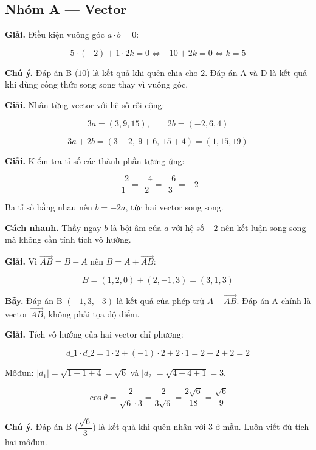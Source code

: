 \documentclass[11pt, a4paper]{article}
\begin{document}

\subsection*{Nhóm A — Vector}

\begin{dapan}[1 — Đáp án C]
\textbf{Giải.} Điều kiện vuông góc $a \cdot b = 0$:

$$5 \cdot (-2) + 1 \cdot 2k = 0 \iff -10 + 2k = 0 \iff k = 5$$

\textbf{Chú ý.} Đáp án B ($10$) là kết quả khi quên chia cho $2$. Đáp án A và D là kết quả khi dùng công thức song song thay vì vuông góc.
\end{dapan}

\begin{dapan}[2 — Đáp án D]
\textbf{Giải.} Nhân từng vector với hệ số rồi cộng:

$$3a = (3, 9, 15), \qquad 2b = (-2, 6, 4)$$

$$3a + 2b = (3 - 2,\ 9 + 6,\ 15 + 4) = (1, 15, 19)$$
\end{dapan}

\begin{dapan}[3 — Đáp án A]
\textbf{Giải.} Kiểm tra tỉ số các thành phần tương ứng:

$$\frac{-2}{1} = \frac{-4}{2} = \frac{-6}{3} = -2$$

Ba tỉ số bằng nhau nên $b = -2a$, tức hai vector song song.

\textbf{Cách nhanh.} Thấy ngay $b$ là bội âm của $a$ với hệ số $-2$ nên kết luận song song mà không cần tính tích vô hướng.
\end{dapan}

\begin{dapan}[4 — Đáp án D]
\textbf{Giải.} Vì $\overrightarrow{AB} = B - A$ nên $B = A + \overrightarrow{AB}$:

$$B = (1, 2, 0) + (2, -1, 3) = (3, 1, 3)$$

\textbf{Bẫy.} Đáp án B $(-1, 3, -3)$ là kết quả của phép trừ $A - \overrightarrow{AB}$. Đáp án A chính là vector $\overrightarrow{AB}$, không phải tọa độ điểm.
\end{dapan}

\begin{dapan}[5 — Đáp án D]
\textbf{Giải.} Tích vô hướng của hai vector chỉ phương:

$$d\_1 \cdot d\_2 = 1 \cdot 2 + (-1) \cdot 2 + 2 \cdot 1 = 2 - 2 + 2 = 2$$

Môđun: $\lvert d_1 \rvert = \sqrt{1 + 1 + 4} = \sqrt{6}$ và $\lvert d_2 \rvert = \sqrt{4 + 4 + 1} = 3$.

$$\cos\theta = \frac{2}{\sqrt{6} \cdot 3} = \frac{2}{3\sqrt{6}} = \frac{2\sqrt{6}}{18} = \frac{\sqrt{6}}{9}$$

\textbf{Chú ý.} Đáp án B ($\dfrac{\sqrt{6}}{3}$) là kết quả khi quên nhân với $3$ ở mẫu. Luôn viết đủ tích hai môđun.
\end{dapan}
\end{document}
